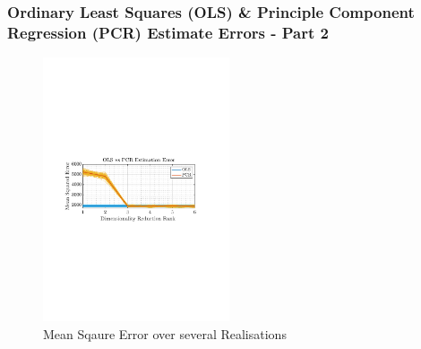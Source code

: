 \documentclass[12pt]{article}
\begin{document}
 	\subsubsection{Ordinary Least Squares (OLS) \& Principle Component Regression (PCR)  Estimate Errors - Part 2}
 	\begin{figure}
 		\begin{centering}
 			\includegraphics[trim={2.2cm 11.2cm 3.15cm  11.2cm}, clip, width=0.49\textwidth]{../MATLAB/figures/q1_6d_fig01.pdf} 
 		\end{centering}
 		\captionsetup{justification=centering}
 		\caption{Mean Sqaure Error over several Realisations}
 		\label{fig: 1-6d}
 	\end{figure}
\end{document}
